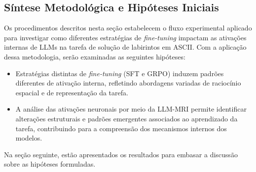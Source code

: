 \subsection{Síntese Metodológica e Hipóteses Iniciais}

Os procedimentos descritos nesta seção estabelecem o fluxo experimental aplicado para investigar como diferentes estratégias de \textit{fine-tuning} impactam as ativações internas de LLMs na tarefa de solução de labirintos em ASCII. Com a aplicação dessa metodologia, serão examinadas as seguintes hipóteses:

\begin{itemize}
    \item[H1:] Estratégias distintas de \textit{fine-tuning} (SFT e GRPO) induzem padrões diferentes de ativação interna, refletindo abordagens variadas de raciocínio espacial e de representação da tarefa.
    \item[H2:] A análise das ativações neuronais por meio da LLM-MRI permite identificar alterações estruturais e padrões emergentes associados ao aprendizado da tarefa, contribuindo para a compreensão dos mecanismos internos dos modelos.
\end{itemize}

Na seção seguinte, estão apresentados os resultados para embasar a discussão sobre as hipóteses formuladas.

\newpage